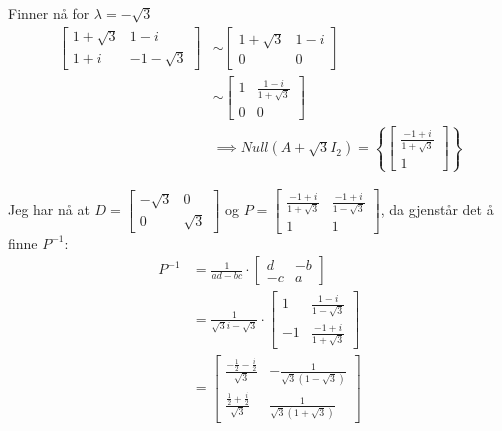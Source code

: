 \documentclass[11pt, a4paper, norsk]{NTNUoving}
\begin{document}
\begin{oppgave}
        Finner nå for $\lambda = -\sqrt{3}$
        \begin{align*}
            \begin{bmatrix}
                1+\sqrt{3} & 1-i \\
                1+i & -1-\sqrt{3}
            \end{bmatrix} &\sim \begin{bmatrix}
            1+\sqrt{3} & 1-i \\
            0 & 0
            \end{bmatrix}
            \\
            &\sim \begin{bmatrix}
                1 & \frac{1-i}{1+\sqrt{3}} \\
                0 & 0
            \end{bmatrix}
            \\
            &\implies Null(A + \sqrt{3}I_2) = \left\{\begin{bmatrix}
                    \frac{-1+i}{1+\sqrt{3}} \\
                    1
            \end{bmatrix}\right\}
        \end{align*}
        
        Jeg har nå at $D = \begin{bmatrix}
            -\sqrt{3} & 0 \\
            0 & \sqrt{3}
        \end{bmatrix}$ og $P = \begin{bmatrix}
            \frac{-1+i}{1+\sqrt{3}} & \frac{-1+i}{1-\sqrt{3}} \\
            1 & 1
        \end{bmatrix}$, da gjenstår det å finne $P^{-1}$:
        \begin{align*}
            P^{-1} &= \frac{1}{ad-bc}\cdot \begin{bmatrix}
                d & -b \\
                -c & a
            \end{bmatrix}
            \\
                 &= \frac{1}{\sqrt{3}i-\sqrt{3}} \cdot \begin{bmatrix}
                     1 & \frac{1-i}{1-\sqrt{3}} \\
                     -1 & \frac{-1+i}{1+\sqrt{3}}
                 \end{bmatrix}
                 \\
                 &= \begin{bmatrix}
                     \frac{-\frac{1}{2} - \frac{i}{2}}{\sqrt{3}} & -\frac{1}{\sqrt{3}(1-\sqrt{3})} \\
                     \frac{\frac{1}{2} + \frac{i}{2}}{\sqrt{3}} & \frac{1}{\sqrt{3}(1+\sqrt{3})}
                 \end{bmatrix}
        \end{align*}        
    \end{oppgave}
\end{document}
